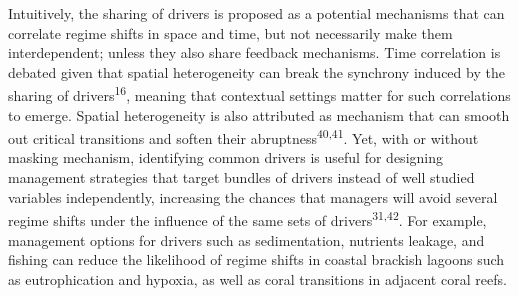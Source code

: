 \documentclass[9pt,]{article}
\begin{document}
Intuitively, the sharing of drivers is proposed as a potential
mechanisms that can correlate regime shifts in space and time, but not
necessarily make them interdependent; unless they also share feedback
mechanisms. Time correlation is debated given that spatial heterogeneity
can break the synchrony induced by the sharing of
drivers\textsuperscript{16}, meaning that contextual settings matter for
such correlations to emerge. Spatial heterogeneity is also attributed as
mechanism that can smooth out critical transitions and soften their
abruptness\textsuperscript{40,41}. Yet, with or without masking
mechanism, identifying common drivers is useful for designing management
strategies that target bundles of drivers instead of well studied
variables independently, increasing the chances that managers will avoid
several regime shifts under the influence of the same sets of
drivers\textsuperscript{31,42}. For example, management options for
drivers such as sedimentation, nutrients leakage, and fishing can reduce
the likelihood of regime shifts in coastal brackish lagoons such as
eutrophication and hypoxia, as well as coral transitions in adjacent
coral reefs.
\end{document}
